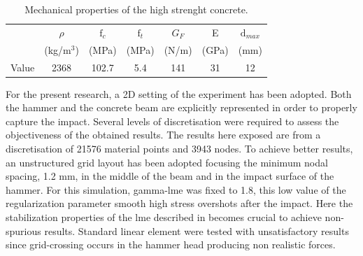 \documentclass[preprint,12pt,a4paper]{elsarticle}
\begin{document}
\begin{table}
  \centering
  \begin{tabular}[]{c c c c c c c}
    \hline
      &   $\rho$   & $\text{f}_c$ & $\text{f}_t$ & $G_F$ &   E   & $\text{d}_{max}$ \\
      & (kg/m$^3$) &     (MPa)    &     (MPa)    & (N/m) & (GPa) & (mm) \\
    \hline
Value &    2368    &     102.7    &      5.4     &  141  &   31  &  12 \\
    \hline
  \end{tabular}
  \caption[Mechanical properties of thje concrete]{Mechanical
    properties of the high strenght concrete.}
  \label{tab:concrete-properties}
\end{table}
For the present research, a 2D setting of the experiment has been
adopted. Both the hammer and the concrete beam are explicitly
represented in order to properly capture the impact. Several levels of
discretisation were required to assess the objectiveness of the
obtained results. The results here exposed are from a discretisation
of 21576 material points and 3943 nodes. To achieve better results, an
unstructured grid layout has been adopted focusing the minimum nodal
spacing, 1.2 mm, in the middle of the beam and in the impact surface
of the hammer. For this simulation, \gls{gamma-lme} was fixed to
1.8, this low value of the regularization parameter smooth high stress
overshots after the impact. Here the stabilization properties of the \acrshort{lme}
described in \cite{Molinos2020} becomes crucial to achieve
non-spurious results. Standard linear element were tested
with unsatisfactory results since grid-crossing occurs in the hammer
head producing non realistic forces.\\
\end{document}
